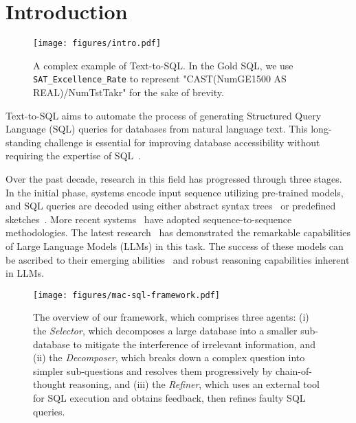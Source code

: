 \section{Introduction}

\begin{figure}[t]
    \centering
    \texttt{[image: figures/intro.pdf]}
    \caption{A complex example of Text-to-SQL. In the Gold SQL, we use \texttt{SAT\_Excellence\_Rate} to represent "CAST(NumGE1500 AS REAL)/NumTstTakr" for the sake of brevity.}
    \label{fig:intro-demo}
\end{figure}

Text-to-SQL aims to automate the process of generating Structured Query Language (SQL) queries for databases from natural language text.
This long-standing challenge is essential for improving database accessibility without requiring the expertise of SQL~\citep{qin2022survey,sun2023sqlpalm}.

Over the past decade, research in this field has progressed through three stages. In the initial phase, systems encode input sequence utilizing pre-trained models, and SQL queries are decoded using either abstract syntax trees~\citep{xu2017sqlnet, guo2019complex, wang2021ratsql} or predefined sketches~\citep{he2019xsql}. More recent systems~\citep{raffel2023exploring,xie2022unifiedskg, scholak2021picard} have adopted sequence-to-sequence methodologies. 
The latest research~\citep{ouyang2022training,OpenAI2023GPT4TR,rozière2023code} has demonstrated the remarkable capabilities of Large Language Models (LLMs) in this task. The success of these models can be ascribed to their emerging abilities~\citep{wei2023chainofthought,brown2020language} and robust reasoning capabilities inherent in LLMs.

\begin{figure*}[ht]
    \centering
    \texttt{[image: figures/mac-sql-framework.pdf]}
    \caption{The overview of our \ours{} framework, which comprises three agents: (i) the \textit{Selector}, which decomposes a large database into a smaller sub-database to mitigate the interference of irrelevant information, and (ii) the \textit{Decomposer}, which breaks down a complex question into simpler sub-questions and resolves them progressively by chain-of-thought reasoning, and (iii) the \textit{Refiner}, which uses an external tool for SQL execution and obtains feedback, then refines faulty SQL queries.}
    \label{fig:framework}
\end{figure*}

